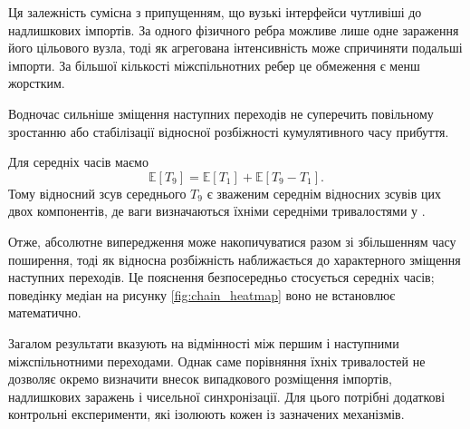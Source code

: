Ця залежність сумісна
з припущенням, що вузькі
інтерфейси чутливіші
до надлишкових імпортів.
За одного фізичного ребра
можливе лише одне
зараження його цільового
вузла, тоді як агрегована
інтенсивність може
спричиняти подальші імпорти.
За більшої кількості
міжспільнотних ребер
це обмеження є менш
жорстким.

Водночас сильніше зміщення
наступних переходів
не суперечить повільному
зростанню або стабілізації
відносної розбіжності
кумулятивного часу прибуття.

Для середніх часів маємо
\begin{equation}
\mathbb{E}[T_9]
=
\mathbb{E}[T_1]
+
\mathbb{E}[T_9-T_1].
\end{equation}
Тому відносний зсув
середнього $T_9$
є зваженим середнім
відносних зсувів
цих двох компонентів,
де ваги визначаються
їхніми середніми
тривалостями у \Full{}.

Отже, абсолютне випередження
може накопичуватися разом
зі збільшенням часу поширення,
тоді як відносна розбіжність
наближається до характерного
зміщення наступних переходів.
Це пояснення безпосередньо
стосується середніх часів;
поведінку медіан на рисунку
\ref{fig:chain_heatmap} воно
не встановлює математично.

Загалом результати вказують
на відмінності між першим
і наступними міжспільнотними
переходами. Однак саме
порівняння їхніх тривалостей
не дозволяє окремо визначити
внесок випадкового розміщення
імпортів, надлишкових
заражень і чисельної
синхронізації.
Для цього потрібні додаткові
контрольні експерименти,
які ізолюють кожен
із зазначених механізмів.







